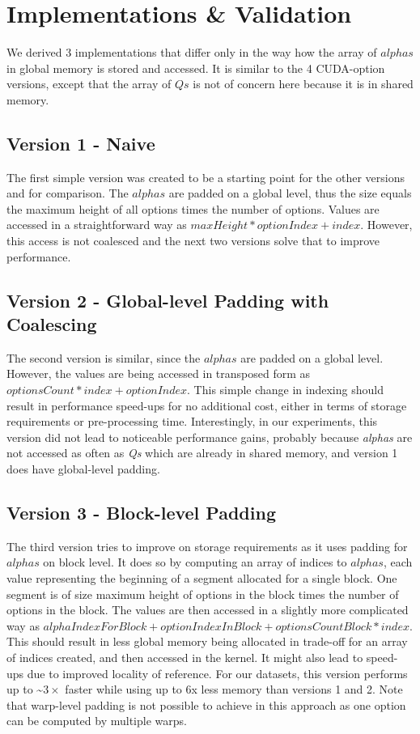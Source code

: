 \section{Implementations \& Validation}
\label{section:cuda-multi-versions}
We derived 3 implementations that differ only in the way how the array of $\mathit{alphas}$ in global memory is stored and accessed. It is similar to the 4 CUDA-option versions, except that the array of $\mathit{Qs}$ is not of concern here because it is in shared memory.

\subsection*{Version 1 - Naive}
The first simple version was created to be a starting point for the other versions and for comparison. The $\mathit{alphas}$ are padded on a global level, thus the size equals the maximum height of all options times the number of options. Values are accessed in a straightforward way as $\mathit{maxHeight} * \mathit{optionIndex} + \mathit{index}$. However, this access is not coalesced and the next two versions solve that to improve performance.

\subsection*{Version 2 - Global-level Padding with Coalescing}
The second version is similar, since the $\mathit{alphas}$ are padded on a global level. However, the values are being accessed in transposed form as $\mathit{optionsCount} * \mathit{index} + \mathit{optionIndex}$. This simple change in indexing should result in performance speed-ups for no additional cost, either in terms of storage requirements or pre-processing time. Interestingly, in our experiments, this version did not lead to noticeable performance gains, probably because \textit{alphas} are not accessed as often as \textit{Qs} which are already in shared memory, and version 1 does have global-level padding.

\subsection*{Version 3 - Block-level Padding}
The third version tries to improve on storage requirements as it uses padding for $\mathit{alphas}$ on block level. It does so by computing an array of indices to $\mathit{alphas}$, each value representing the beginning of a segment allocated for a single block. One segment is of size maximum height of options in the block times the number of options in the block. The values are then accessed in a slightly more complicated way as $\mathit{alphaIndexForBlock} + \mathit{optionIndexInBlock} + \mathit{optionsCountBlock} * \mathit{index}$. This should result in less global memory being allocated in trade-off for an array of indices created, and then accessed in the kernel. It might also lead to speed-ups due to improved locality of reference. For our datasets, this version performs up to \textasciitilde$3\times$ faster while using up to 6x less memory than versions 1 and 2. Note that warp-level padding is not possible to achieve in this approach as one option can be computed by multiple warps.

